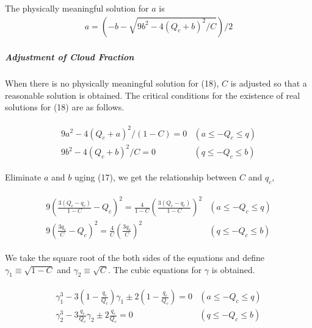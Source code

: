The physically meaningful solution for \(a\) is \begin{eqnarray}
a=\left(-b-\sqrt{9 b^{2}-4\left(Q_{c}+b\right)^{2} / C}\right) / 2
\label{E08-18}
\end{eqnarray}

\hypertarget{adjustment-of-cloud-fraction}{%
\subparagraph{Adjustment of Cloud
Fraction}\label{adjustment-of-cloud-fraction}}

When there is no physically meaningful solution for (18), \(C\) is
adjusted so that a reasonable solution is obtained. The critical
conditions for the existence of real solutions for (18) are as follows.

\begin{eqnarray}
\begin{array}{ll}
9 a^{2}-4\left(Q_{c}+a\right)^{2} /(1-C)=0 & \left(a \leq-Q_{c} \leq q\right) \\
9 b^{2}-4\left(Q_{c}+b\right)^{2} / C=0 & \left(q \leq-Q_{c} \leq b\right)
\end{array}
\end{eqnarray}

Eliminate \(a\) and \(b\) uging (17), we get the relationship between
\(C\) and \(q_c\),

\begin{eqnarray}
\begin{array}{ll}
9\left(\frac{3\left(Q_{c}-q_{c}\right)}{1-C}-Q_{c}\right)^{2}=\frac{4}{1-C}\left(\frac{3\left(Q_{c}-q_{c}\right)}{1-C}\right)^{2} & \left(a \leq-Q_{c} \leq q\right) \\
9\left(\frac{3 q_{c}}{C}-Q_{c}\right)^{2}=\frac{4}{C}\left(\frac{3 q_{c}}{C}\right)^{2} & \left(q \leq-Q_{c} \leq b\right)
\end{array}
\end{eqnarray}

We take the square root of the both sides of the equations and define
\(\gamma_{1} \equiv\sqrt{1-C}\) and \(\gamma_{2} \equiv\sqrt{C}\). The
cubic equations for \(\gamma\) is obtained.

\begin{eqnarray}
\begin{array}{ll}
\gamma_{1}^{3}-3\left(1-\frac{q_{c}}{Q_{c}}\right) \gamma_{1} \pm 2\left(1-\frac{q_{c}}{Q_{c}}\right)=0 & \left(a \leq-Q_{c} \leq q\right) \\
\gamma_{2}^{3}-3 \frac{q_{c}}{Q_{c}} \gamma_{2} \pm 2 \frac{q_{c}}{Q_{c}}=0 & \left(q \leq-Q_{c} \leq b\right)
\end{array}
\end{eqnarray}

